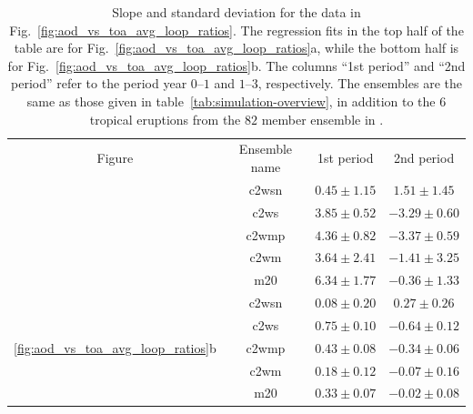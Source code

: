 \documentclass{ametsocV6.1}
\begin{document}
\begin{table}
  \centering

  \caption{Slope and standard deviation for the data in
    Fig.~\ref{fig:aod_vs_toa_avg_loop_ratios}. The regression fits in the top half of the
    table are for Fig.~\ref{fig:aod_vs_toa_avg_loop_ratios}a, while the bottom half is for
    Fig.~\ref{fig:aod_vs_toa_avg_loop_ratios}b. The columns ``1st period'' and ``2nd
    period'' refer to the period year \(0\)--\(1\) and \(1\)--\(3\), respectively. The
    ensembles are the same as those given in table~\ref{tab:simulation-overview}, in
    addition to the \(6\) tropical eruptions from the \(82\) member ensemble in
    \citet{marshall2020}.}\label{tab:slope-gradients}%
  \begin{tabular}{cccc}
    Figure                                                  & Ensemble name & 1st period      & 2nd period       \\
    \rowcolor{LightGray}                                    & \gls{c2wsn}   & \(0.45\pm1.15\) & \(1.51\pm1.45\)  \\
    \rowcolor{LightGray}                                    & \gls{c2ws}    & \(3.85\pm0.52\) & \(-3.29\pm0.60\) \\
    \rowcolor{LightGray}                                    & \gls{c2wmp}   & \(4.36\pm0.82\) & \(-3.37\pm0.59\) \\
    \rowcolor{LightGray}                                    & \gls{c2wm}    & \(3.64\pm2.41\) & \(-1.41\pm3.25\) \\
    \rowcolor{LightGray}                                    & \gls{m20}     & \(6.34\pm1.77\) & \(-0.36\pm1.33\) \\
    \multirow{5}{*}{\ref{fig:aod_vs_toa_avg_loop_ratios}b}  & \gls{c2wsn}   & \(0.08\pm0.20\) & \(0.27\pm0.26\)  \\
    \multirow{-9}{*}{\ref{fig:aod_vs_toa_avg_loop_ratios}a} & \gls{c2ws}    & \(0.75\pm0.10\) & \(-0.64\pm0.12\) \\
                                                            & \gls{c2wmp}   & \(0.43\pm0.08\) & \(-0.34\pm0.06\) \\
                                                            & \gls{c2wm}    & \(0.18\pm0.12\) & \(-0.07\pm0.16\) \\
                                                            & \gls{m20}     & \(0.33\pm0.07\) & \(-0.02\pm0.08\) \\
  \end{tabular}
\end{table}
\end{document}
